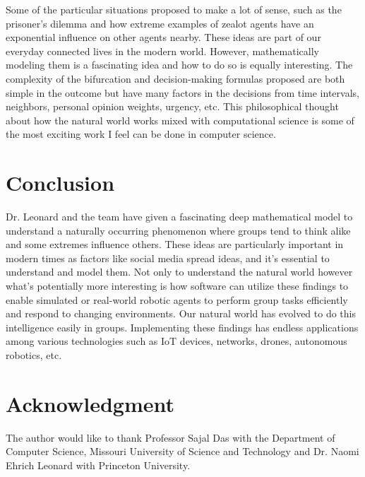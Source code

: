 \documentclass[journal,onecolumn]{IEEEtran}
\begin{document}
Some of the particular situations proposed to make a lot of sense, such as the prisoner's dilemma and how extreme examples of zealot agents have an exponential influence on other agents nearby. These ideas are part of our everyday connected lives in the modern world. However, mathematically modeling them is a fascinating idea and how to do so is equally interesting. The complexity of the bifurcation and decision-making formulas proposed are both simple in the outcome but have many factors in the decisions from time intervals, neighbors, personal opinion weights, urgency, etc. This philosophical thought about how the natural world works mixed with computational science is some of the most exciting work I feel can be done in computer science. 

\section{Conclusion}

Dr. Leonard and the team have given a fascinating deep mathematical model to understand a naturally occurring phenomenon where groups tend to think alike and some extremes influence others. These ideas are particularly important in modern times as factors like social media spread ideas, and it's essential to understand and model them. Not only to understand the natural world however what's potentially more interesting is how software can utilize these findings to enable simulated or real-world robotic agents to perform group tasks efficiently and respond to changing environments. Our natural world has evolved to do this intelligence easily in groups. Implementing these findings has endless applications among various technologies such as IoT devices, networks, drones, autonomous robotics, etc. 




\section*{Acknowledgment}
The author would like to thank Professor Sajal Das with the Department of Computer Science, Missouri University of Science and Technology and Dr. Naomi Ehrich Leonard with Princeton University.
\end{document}
